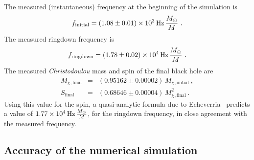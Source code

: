 The measured (instantaneous) frequency at the beginning of the
simulation is
\begin{equation}
  \label{eq:MeasuredStartingFreq}
  f_{\mathrm{initial}} = \unit[(1.08 \pm 0.01) \times 10^{3}]{Hz}\,
  \frac{\MSun}{M}\ .
\end{equation}
The measured ringdown frequency is
\begin{equation}
  \label{eq:MeasuredRingdownFreq}
  f_{\mathrm{ringdown}} = \unit[(1.78 \pm 0.02) \times 10^{4}]{Hz}\,
  \frac{\MSun}{M}\ .
\end{equation}
The measured \emph{Christodoulou} mass and spin of the final black
hole are
\begin{eqnarray}
  \label{eq:MeasuredFinalMass}
  M_{\chi\mathrm{, final}} &= &(0.95162 \pm 0.00002)\, M_{\chi\mathrm{,
      initial}}\ , \\
  \label{eq:MeasuredFinalSpin}
  S_{\mathrm{final}} &= &(0.68646 \pm 0.00004)\, M^{2}_{\chi\mathrm{, final}}\ .
\end{eqnarray}
Using this value for the spin, a quasi-analytic formula due to
Echeverria~\cite{Echeverria1989} predicts a value of
$\unit[1.77\times10^{4}]{Hz}\, \frac{\MSun}{M}$, for the ringdown
frequency, in close agreement with the measured frequency.

\subsection{Accuracy of the numerical simulation}
\label{sec:Accuracy}

